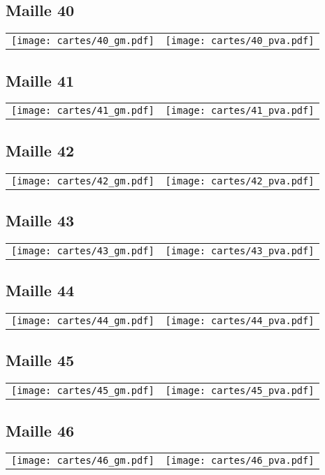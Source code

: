 \subsection{Maille 40}
\begin{tabular}{ll}
\texttt{[image: cartes/40\_gm.pdf]}
&
\texttt{[image: cartes/40\_pva.pdf]}
\end{tabular}
\newpage
\subsection{Maille 41}
\begin{tabular}{ll}
\texttt{[image: cartes/41\_gm.pdf]}
&
\texttt{[image: cartes/41\_pva.pdf]}
\end{tabular}
\newpage
\subsection{Maille 42}
\begin{tabular}{ll}
\texttt{[image: cartes/42\_gm.pdf]}
&
\texttt{[image: cartes/42\_pva.pdf]}
\end{tabular}
\newpage
\subsection{Maille 43}
\begin{tabular}{ll}
\texttt{[image: cartes/43\_gm.pdf]}
&
\texttt{[image: cartes/43\_pva.pdf]}
\end{tabular}
\newpage
\subsection{Maille 44}
\begin{tabular}{ll}
\texttt{[image: cartes/44\_gm.pdf]}
&
\texttt{[image: cartes/44\_pva.pdf]}
\end{tabular}
\newpage
\subsection{Maille 45}
\begin{tabular}{ll}
\texttt{[image: cartes/45\_gm.pdf]}
&
\texttt{[image: cartes/45\_pva.pdf]}
\end{tabular}
\newpage
\subsection{Maille 46}
\begin{tabular}{ll}
\texttt{[image: cartes/46\_gm.pdf]}
&
\texttt{[image: cartes/46\_pva.pdf]}
\end{tabular}
\newpage

